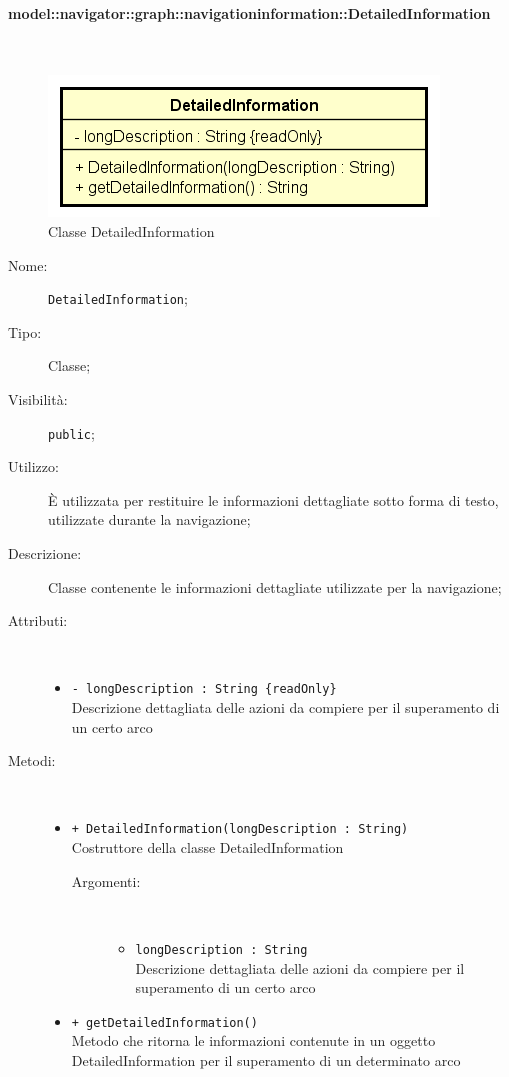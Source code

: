 \documentclass[../DefinizioneDiProdotto.tex]{subfiles}
\begin{document}
\paragraph{model::navigator::graph::navigationinformation::DetailedInformation}
\
\begin{figure}[H]
	\centering
	\includegraphics[width=\maxwidth]{img/DetailedInformation.png}
	\caption{Classe DetailedInformation}\label{fig:model::navigator::graph::navigationinformation::DetailedInformation} 
\end{figure}
\begin{description}
	\item[Nome:] \texttt{DetailedInformation};
	\item[Tipo:] Classe;
	\item[Visibilità:] \texttt{public};
	\item[Utilizzo:] È utilizzata per restituire le informazioni dettagliate sotto forma di testo, utilizzate durante la navigazione;
	\item[Descrizione:] Classe contenente le informazioni dettagliate utilizzate per la navigazione;
	\item[Attributi:] \
	\begin{itemize}
		\item \texttt{- longDescription : String \{readOnly\}}\\
		Descrizione dettagliata delle azioni da compiere per il superamento di un certo arco
		
	\end{itemize}
	\item[Metodi:] \
	\begin{itemize}
		\item \texttt{+ DetailedInformation(longDescription : String)}\\
		Costruttore della classe DetailedInformation
		\begin{description}
			\item[Argomenti:] \
			\begin{itemize}
				\item \texttt{longDescription : String}\\
				Descrizione dettagliata delle azioni da compiere per il superamento di un certo arco\end{itemize}
		\end{description}
		\item \texttt{+ getDetailedInformation()}\\
		Metodo che ritorna le informazioni contenute in un oggetto DetailedInformation per il superamento di un determinato arco
	\end{itemize}
\end{description}
\end{document}
